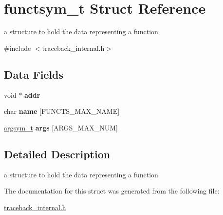 \hypertarget{structfunctsym__t}{\section{functsym\-\_\-t Struct Reference}
\label{structfunctsym__t}
}


a structure to hold the data representing a function  




{\ttfamily \#include $<$traceback\-\_\-internal.\-h$>$}

\subsection*{Data Fields}
\begin{DoxyCompactItemize}
\item 
\hypertarget{structfunctsym__t_af0c2473b6ed0f357b269a8bcc24fee7b}{void $\ast$ {\bfseries addr}}\label{structfunctsym__t_af0c2473b6ed0f357b269a8bcc24fee7b}

\item 
\hypertarget{structfunctsym__t_aae7c7600a22b2dd90f195da2fb6acec0}{char {\bfseries name} \mbox{[}F\-U\-N\-C\-T\-S\-\_\-\-M\-A\-X\-\_\-\-N\-A\-M\-E\mbox{]}}\label{structfunctsym__t_aae7c7600a22b2dd90f195da2fb6acec0}

\item 
\hypertarget{structfunctsym__t_aa83afa9fc97120cb8c4f1083f1827522}{\hyperlink{structargsym__t}{argsym\-\_\-t} {\bfseries args} \mbox{[}A\-R\-G\-S\-\_\-\-M\-A\-X\-\_\-\-N\-U\-M\mbox{]}}\label{structfunctsym__t_aa83afa9fc97120cb8c4f1083f1827522}

\end{DoxyCompactItemize}


\subsection{Detailed Description}
a structure to hold the data representing a function 

The documentation for this struct was generated from the following file\-:\begin{DoxyCompactItemize}
\item 
\hyperlink{traceback__internal_8h}{traceback\-\_\-internal.\-h}\end{DoxyCompactItemize}
